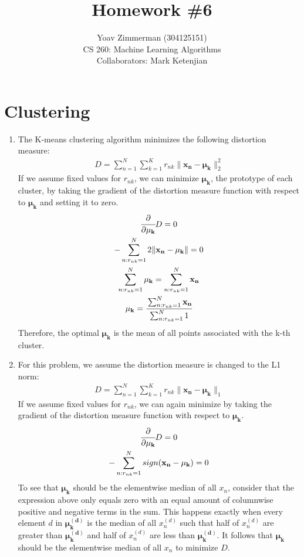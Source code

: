 \documentclass[12pt]{article}
\begin{document}
\title{Homework \#6}
\author{Yoav Zimmerman (304125151) \\
	    CS 260: Machine Learning Algorithms \\
	   Collaborators: Mark Ketenjian}
\maketitle

\section{Clustering}
\begin{enumerate}[label=\alph*.]
	\item The K-means clustering algorithm minimizes the following distortion measure:
	\begin{gather*}
		D = \sum_{n=1}^{N}{ \sum_{k=1}^{K}{ r_{nk} \lVert \mathbf{x_n} - \mathbf{\mu_k} \rVert^2_2}}
	\end{gather*}
	If we assume fixed values for $r_{nk}$, we can minimize $\mathbf{\mu_k}$, the prototype of each cluster, by taking the gradient of the distortion measure function with respect to $\mathbf{\mu_k}$ and setting it to zero.
	\begin{gather*}
		\cfrac{\partial}{ \partial \mathbf{\mu_k}} D = 0 \\
		- \sum_{n: r_{nk} = 1}^{N}{ 2 \lVert \mathbf{x_n} - \mathbf{\mu_k} \rVert} = 0 \\
		\sum_{n: r_{nk} = 1}^{N}{ \mathbf{\mu_k} } = \sum_{n: r_{nk} = 1}^{N}{ \mathbf{x_n} } \\
		\mathbf{\mu_k}= \cfrac{\sum_{n: r_{nk} = 1}^{N}{ \mathbf{x_n} }}{ \sum_{n: r_{nk} = 1}^{N}{1}}
	\end{gather*}
	Therefore, the optimal $\mathbf{\mu_k}$ is the mean of all points associated with the k-th cluster.
	\item For this problem, we assume the distortion measure is changed to the L1 norm:
	\begin{gather*}
		D = \sum_{n=1}^{N}{ \sum_{k=1}^{K}{ r_{nk} \lVert \mathbf{x_n} - \mathbf{\mu_k} \rVert_1}}
	\end{gather*}
	If we assume fixed values for $r_{nk}$, we can again minimize by taking the gradient of the distortion measure function with respect to $\mathbf{\mu_k}$.
	\begin{gather*}
		\cfrac{\partial}{ \partial \mathbf{\mu_k}} D =  0 \\
		- \sum_{n: r_{nk} = 1}^{N}{ sign(\mathbf{x_n} - \mathbf{\mu_k})} = 0 
	\end{gather*}
	To see that $\mathbf{\mu_k}$ should be the elementwise median of all $x_n$, consider that the expression above only equals zero with an equal amount of columnwise positive and negative terms in the sum. This happens exactly when every element $d$ in $\mathbf{\mu_k^{(d)}}$ is the median of all $x_n^{(d)}$ such that half of $x_n^{(d)}$ are greater than $\mathbf{\mu_k^{(d)}}$ and half of $x_n^{(d)}$ are less than $\mathbf{\mu_k^{(d)}}$. It follows that $\mathbf{\mu_k}$ should be the elementwise median of all $x_n$ to minimize $D$.
\end{enumerate}
\end{document}
